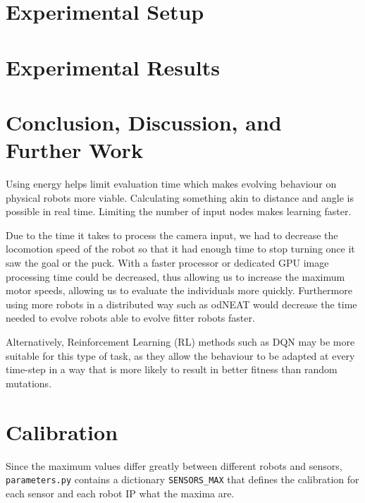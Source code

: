 \documentclass{article}
\begin{document}

	\section{Experimental Setup} %
	\label{sec:setup}


	\section{Experimental Results} %
	\label{sec:results}
	

	\section{Conclusion, Discussion, and Further Work} %
	\label{sec:conclusion}
	Using energy helps limit evaluation time which makes evolving behaviour on
	physical robots more viable.
	Calculating something akin to distance and angle is possible in real time.
	Limiting the number of input nodes makes learning faster. %

	Due to the time it takes to process the camera input, we had to decrease
	the locomotion speed of the robot so that it had enough time to stop
	turning once it saw the goal or the puck. With a faster processor or
	dedicated GPU image processing time could be decreased, thus allowing us to
	increase the maximum motor speeds, allowing us to evaluate the individuals
	more quickly.
	Furthermore using more robots in a distributed way such as
	odNEAT \cite{silva2012odneat} would decrease the time needed to evolve
	robots able to evolve fitter robots faster.

	Alternatively, Reinforcement Learning (RL) methods such as DQN
	\cite{mnih2013playing} may be more suitable for this type of task, as they
	allow the behaviour to be adapted at every time-step in a way that is more
	likely to result in better fitness than random mutations.

	\appendix

	\section{Calibration} %
	\label{sec:Calibration}
	Since the maximum values differ greatly between different robots and
	sensors, \texttt{parameters.py} contains a dictionary \texttt{SENSORS\_MAX}
	that defines the calibration for each sensor and each robot IP what the
	maxima are.
\end{document}
